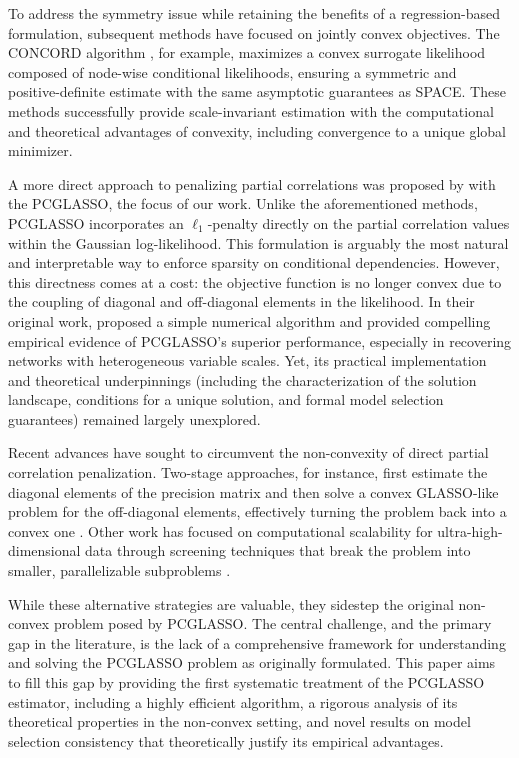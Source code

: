 \documentclass[12pt]{amsart}
\numberwithin{equation}{section}
\numberwithin{equation}{section}
\theoremstyle{plain}
\theoremstyle{definition}
\begin{document}
To address the symmetry issue while retaining the benefits of a regression-based formulation, subsequent methods have focused on jointly convex objectives. The CONCORD algorithm  \cite{CONCORD15}, for example, maximizes a convex surrogate likelihood composed of node-wise conditional likelihoods, ensuring a symmetric and positive-definite estimate with the same asymptotic guarantees as SPACE. These methods successfully provide scale-invariant estimation with the computational and theoretical advantages of convexity, including convergence to a unique global minimizer.

A more direct approach to penalizing partial correlations was proposed by \cite{Carter} with the PCGLASSO, the focus of our work. Unlike the aforementioned methods, PCGLASSO incorporates an $\ell_1$-penalty directly on the partial correlation values within the Gaussian log-likelihood. This formulation is arguably the most natural and interpretable way to enforce sparsity on conditional dependencies. However, this directness comes at a cost: the objective function is no longer convex due to the coupling of diagonal and off-diagonal elements in the likelihood. In their original work, \cite{Carter} proposed a simple numerical algorithm and provided compelling empirical evidence of PCGLASSO's superior performance, especially in recovering networks with heterogeneous variable scales. Yet, its practical implementation and theoretical underpinnings (including the characterization of the solution landscape, conditions for a unique solution, and formal model selection guarantees) remained largely unexplored.

Recent advances have sought to circumvent the non-convexity of direct partial correlation penalization. Two-stage approaches, for instance, first estimate the diagonal elements of the precision matrix and then solve a convex GLASSO-like problem for the off-diagonal elements, effectively turning the problem back into a convex one \cite{SPACE23}. Other work has focused on computational scalability for ultra-high-dimensional data through screening techniques that break the problem into smaller, parallelizable subproblems \cite{SCREEN16}.

While these alternative strategies are valuable, they sidestep the original non-convex problem posed by PCGLASSO. The central challenge, and the primary gap in the literature, is the lack of a comprehensive framework for understanding and solving the PCGLASSO problem as originally formulated. This paper aims to fill this gap by providing the first systematic treatment of the PCGLASSO estimator, including a highly efficient algorithm, a rigorous analysis of its theoretical properties in the non-convex setting, and novel results on model selection consistency that theoretically justify its empirical advantages.
\end{document}
